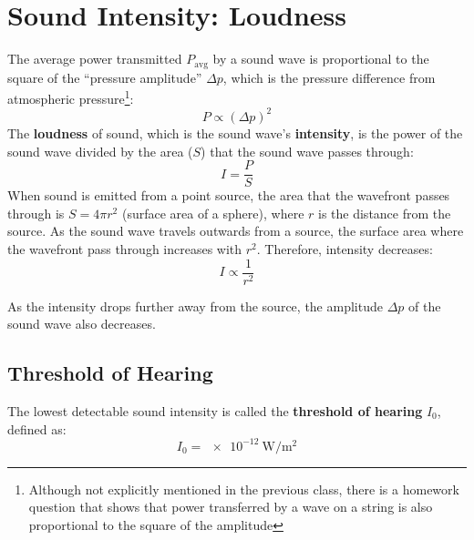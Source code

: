\section{Sound Intensity: Loudness}

The average power transmitted $P_\text{avg}$ by a sound wave is proportional
to the square of the ``pressure amplitude'' $\Delta p$, which is the pressure
difference from atmospheric pressure\footnote{Although not explicitly
mentioned in the previous class, there is a homework question that shows
that power transferred by a wave on a string is also proportional to the
square of the amplitude}:
\begin{equation}
  P\propto(\Delta p)^2
\end{equation}
The \textbf{loudness} of sound, which is the sound wave's \textbf{intensity},
is the power of the sound wave divided by the area ($S$) that the sound wave
passes through:
\begin{equation}
  \boxed{I=\frac PS}%
\end{equation}
When sound is emitted from a point source, the area that the wavefront passes
through is $S=4\pi r^2$ (surface area of a sphere), where $r$ is the distance
from the source. As the sound wave travels outwards from a source, the surface
area where the  wavefront pass through increases with $r^2$. Therefore,
intensity decreases:
\begin{equation}
  I\propto\frac1{r^2}
\end{equation}

As the intensity drops further away from the source, the amplitude $\Delta p$
of the sound wave also decreases.



\subsection{Threshold of Hearing}

The lowest detectable sound intensity is called the
\textbf{threshold of hearing} $I_0$, defined as:
\begin{equation}
  I_0=\SI{e-12}{\watt\per\metre\squared}
\end{equation}
  
